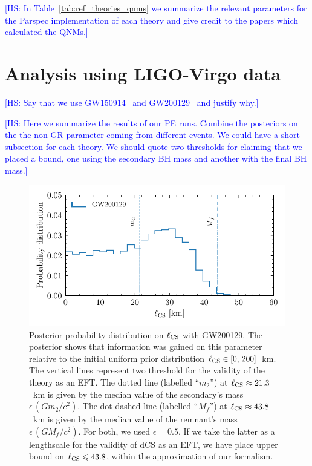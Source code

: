 \documentclass[twocolumn,prd,aps,superscriptaddress,preprintnumbers,tightenlines,showpacs,nofootinbib,eqsecnum,amsfonts,amsmath,longbibliography]{revtex4-1}
\newcommand{\hs}[1]{{\textcolor{blue}{{[HS: #1]}} }}
\begin{document}
\hs{In Table~\ref{tab:ref_theories_qnms} we summarize the relevant parameters for
the {\sc Parspec} implementation of each theory and give credit to the papers
which calculated the QNMs.}

\section{Analysis using LIGO-Virgo data}
\label{sec:results}

\hs{Say that we use GW150914~\cite{LIGOScientific:2016aoc} and GW200129~\cite{LIGOScientific:2021djp} and justify why.}

\hs{Here we summarize the results of our PE runs. Combine the posteriors on the
the non-GR parameter coming from different events. We could have a short
subsection for each theory. We should quote two thresholds for claiming
that we placed a bound, one using the secondary BH mass and another with
the final BH mass.}

\begin{figure}[t]
\includegraphics[width=\columnwidth]{figs/dcs_GW200129.pdf}
\caption{Posterior probability distribution on $\ell_{\rm CS}$ with GW200129.
The posterior shows that information was gained on this parameter relative to
the initial uniform prior distribution $\ell_{\rm CS} \in [0,\, 200]$~km.
%
The vertical lines represent two threshold for the validity of the theory as
an EFT.
%
The dotted line (labelled ``$m_2$'') at $\ell_{\rm CS} \approx 21.3$~km is
given by the median value of the secondary's mass $\epsilon \, (G m_2 / c^2)$.
%
The dot-dashed line (labelled ``$M_{f}$'') at $\ell_{\rm CS} \approx 43.8$~km is
given by the median value of the remnant's mass $\epsilon \, (G M_{f} / c^2)$.
%
For both, we used $\epsilon = 0.5$.
%
If we take the latter as a lengthscale for the validity of dCS as an EFT, we
have place upper bound on $\ell_{\rm CS} \leqslant 43.8$, within the
approximation of our formalism.
}
\label{fig:dCS_bounds}
\end{figure}
\end{document}
